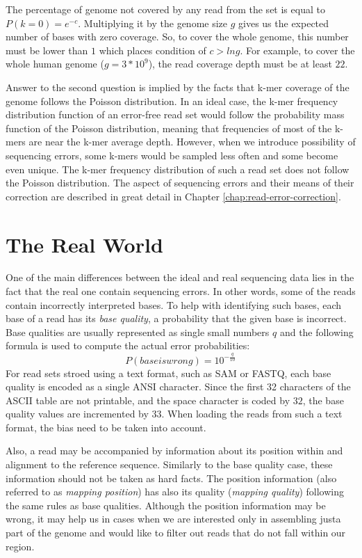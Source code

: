 The percentage of genome not covered by any read from the set is equal to $P(k=0) = e^{-c}$. Multiplying it by the genome size $g$ gives us the expected number of bases with zero coverage. So, to cover the whole genome, this number must be lower than $1$ which places condition of $c > ln g$. For example, to cover the whole human genome ($g = 3 * 10^9$), the read coverage depth must be at least $22$. 

Answer to the second question is implied by the facts that k-mer coverage of the genome follows the Poisson distribution. In an ideal case, the k-mer frequency distribution function of an error-free read set would follow the probability mass function of the Poisson distribution, meaning that frequencies of most of the k-mers are near the k-mer average depth. However, when we introduce possibility of sequencing errors, some k-mers would be sampled less often and some become even unique. The k-mer frequency distribution of such a read set does not follow the Poisson distribution. The aspect of sequencing errors and their means of their correction are described in great detail in Chapter \ref{chap:read-error-correction}.

\section{The Real World}
\label{sec:real-world}

One of the main differences between the ideal and real sequencing data lies in the fact that the real one contain sequencing errors. In other words, some of the reads contain incorrectly interpreted bases. To help with identifying such bases, each base of a read has its \textit{base quality}, a probability that the given base is incorrect. Base qualities are usually represented as single small numbers $q$ and the following formula is used to compute the actual error probabilities:
$$
P(base is wrong) = 10^{-\frac{q}{10}}
$$
For read sets stroed using a text format, such as SAM or FASTQ, each base quality is encoded as a single ANSI character. Since the first 32 characters of the ASCII table are not printable, and the space character is coded by $32$, the base quality values are incremented by $33$. When loading the reads from such a text format, the bias need to be taken into account. 

Also, a read may be accompanied by information about its position within and alignment to the reference sequence. Similarly to the base quality case, these information should not be taken as hard facts. The position information (also referred to as \textit{mapping position}) has also its quality (\textit{mapping quality}) following the same rules as base qualities. Although the position information may be wrong, it may help us in cases when we are interested only in assembling justa part of the genome and would like to filter out reads that do not fall within our region.

